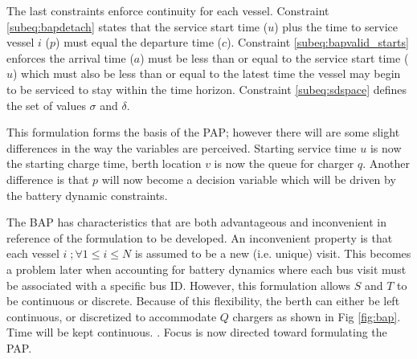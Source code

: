 \documentclass[letterpaper, 10pt, conference]{IEEEtran}
\begin{document}

The last constraints enforce continuity for each vessel. Constraint \eqref{subeq:bapdetach} states that the service start time (\(u\)) plus the time to service vessel \(i\) (\(p\)) must equal the departure time (\(c\)). Constraint \eqref{subeq:bapvalid_starts} enforces the arrival time (\(a\)) must be less than or equal to the service start time (\(u\)) which must also be less than or equal to the latest time the vessel may begin to be serviced to stay within the time horizon. Constraint \eqref{subeq:sdspace} defines the set of values \(\sigma\) and \(\delta\).

This formulation forms the basis of the PAP; however there will are some slight differences in the way the variables are perceived. Starting service time \(u\) is now the starting charge time, berth location \(v\) is now the queue for charger \(q\). Another difference is that \(p\) will now become a decision variable which will be driven by the battery dynamic constraints.

The BAP has characteristics that are both advantageous and inconvenient in reference of the formulation to be developed. An inconvenient property is that each vessel \(i\;; \forall 1 \leq i \leq N\) is assumed to be a new (i.e. unique) visit. This becomes a problem later when accounting for battery dynamics where each bus visit must be associated with a specific bus ID. However, this formulation allows \(S\) and \(T\) to be continuous or discrete. Because of this flexibility, the berth can either be left continuous, or discretized to accommodate \(Q\) chargers as shown in Fig \ref{fig:bap}. Time will be kept continuous. \cite{Buhrkal2010}. Focus is now directed toward formulating the PAP.
\end{document}
